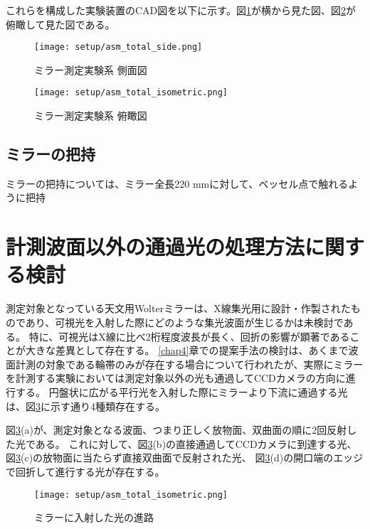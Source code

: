 これらを構成した実験装置のCAD図を以下に示す。図\ref{fig:mirror_experiment_asm_cad_side}が横から見た図、図\ref{fig:mirror_experiment_asm_cad_isometric}が俯瞰して見た図である。

\begin{figure}[!ht]
\centering
\texttt{[image: setup/asm\_total\_side.png]}
\caption{ミラー測定実験系 側面図}
\label{fig:mirror_experiment_asm_cad_side}
\end{figure}

\begin{figure}[!ht]
\centering
\texttt{[image: setup/asm\_total\_isometric.png]}
\caption{ミラー測定実験系 俯瞰図}
\label{fig:mirror_experiment_asm_cad_isometric}
\end{figure}

\subsection{ミラーの把持}
ミラーの把持については、ミラー全長220 mmに対して、ベッセル点で触れるように把持


\clearpage
\newpage

\section{計測波面以外の通過光の処理方法に関する検討}
測定対象となっている天文用Wolterミラーは、X線集光用に設計・作製されたものであり、可視光を入射した際にどのような集光波面が生じるかは未検討である。
特に、可視光はX線に比べ2桁程度波長が長く、回折の影響が顕著であることが大きな差異として存在する。
\ref{chap4}章での提案手法の検討は、あくまで波面計測の対象である輪帯のみが存在する場合について行われたが、実際にミラーを計測する実験においては測定対象以外の光も通過してCCDカメラの方向に進行する。
円盤状に広がる平行光を入射した際にミラーより下流に通過する光は、図\ref{fig:mirror_beam_path_types}に示す通り4種類存在する。

図\ref{fig:mirror_beam_path_types}(a)が、測定対象となる波面、つまり正しく放物面、双曲面の順に2回反射した光である。
これに対して、図\ref{fig:mirror_beam_path_types}(b)の直接通過してCCDカメラに到達する光、
図\ref{fig:mirror_beam_path_types}(c)の放物面に当たらず直接双曲面で反射された光、
図\ref{fig:mirror_beam_path_types}(d)の開口端のエッジで回折して進行する光が存在する。

\begin{figure}[!ht]
\centering
\texttt{[image: setup/asm\_total\_isometric.png]}
\caption{ミラーに入射した光の進路}
\label{fig:mirror_beam_path_types}
\end{figure}

